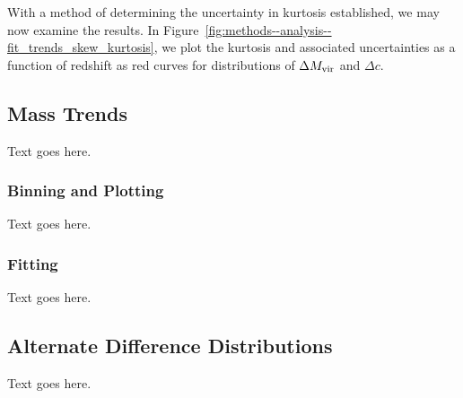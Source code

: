 With a method of determining the uncertainty in kurtosis established, we may now examine the results.  In Figure~\ref{fig:methods--analysis--fit_trends_skew_kurtosis}, we plot the kurtosis and associated uncertainties as a function of redshift as red curves for distributions of $\Delta {M_{\mathrm{vir}}}$ and $\Delta c$.




\subsection{Mass Trends}
\label{subsec:analysis--mass_trends}


Text goes here.



\subsubsection{Binning and Plotting}
\label{subsubsec:analysis--mass_trends--binning_plotting}


Text goes here.



\subsubsection{Fitting}
\label{subsubsec:analysis--mass_trends--fitting}


Text goes here.




\subsection{Alternate Difference Distributions}
\label{subsec:analysis--alt_diff_dist}


Text goes here.



